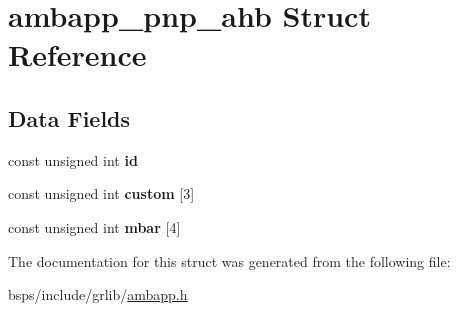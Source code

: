 \hypertarget{structambapp__pnp__ahb}{}\section{ambapp\+\_\+pnp\+\_\+ahb Struct Reference}
\label{structambapp__pnp__ahb}
\subsection*{Data Fields}
\begin{DoxyCompactItemize}
\item 
\mbox{\label{structambapp__pnp__ahb_a598838ff61e043a8520e9da58bd11b07}} 
const unsigned int {\bfseries id}
\item 
\mbox{\label{structambapp__pnp__ahb_a34fe4c383f524f86e8a34388ab553596}} 
const unsigned int {\bfseries custom} \mbox{[}3\mbox{]}
\item 
\mbox{\label{structambapp__pnp__ahb_ad846ce01c4f8d619413356f354c641c8}} 
const unsigned int {\bfseries mbar} \mbox{[}4\mbox{]}
\end{DoxyCompactItemize}


The documentation for this struct was generated from the following file\+:\begin{DoxyCompactItemize}
\item 
bsps/include/grlib/\mbox{\hyperlink{ambapp_8h}{ambapp.\+h}}\end{DoxyCompactItemize}
